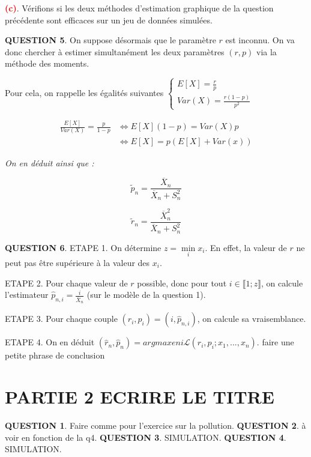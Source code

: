 \documentclass[a4paper,11pt]{article}
\newcommand{\quest}[1]{\small\textbf{#1}\normalsize}
\theoremstyle{nonumberplain}
\theoremstyle{nonumberplain}
\theoremstyle{nonumberplain}
\theoremstyle{nonumberplain}
\begin{document}
      \bigskip
      \textbf{\textcolor{red}{(c)}}. Vérifions si les deux méthodes d'estimation graphique
      de la question précédente sont efficaces sur un jeu de données simulées.

      \quest{QUESTION 5}. On suppose désormais que le paramètre $r$ est inconnu.
      On va donc chercher à estimer simultanément les deux paramètres $(r, p)$ via la méthode des moments.

      \medskip
      Pour cela, on rappelle les égalités suivantes
      $
        \begin{cases}
            E[X] = \frac{r}{p} \\
            Var(X) = \frac{r (1 - p)}{p^2}
        \end{cases}
      $
      \begin{calculs}
          \vspace{-2ex}
          \begin{equation*}
          \begin{split}
              \frac{E[X]}{Var(X)} = \frac{p}{1 - p} & \iff E[X](1 - p) = Var(X) p \\
                                                    & \iff E[X] = p(E[X] + Var(x))
          \end{split}
          \end{equation*}

          \emph{On en déduit ainsi que :}

          \[
              \tilde{p}_n = \frac{\overline{X}_n}{\overline{X}_n + S_n^2}
          \]

          \[
              \tilde{r}_n = \frac{\overline{X}_n^2}{\overline{X}_n + S_n^2}
          \]
      \end{calculs}

      \quest{QUESTION 6}. ETAPE 1. On détermine $z = \min\limits_{i} x_i$.
      En effet, la valeur de $r$ ne peut pas être supérieure à la valeur des $x_i$. \newline

      ETAPE 2. Pour chaque valeur de $r$ possible, donc pour tout $i \in \llbracket 1; z \rrbracket$, on calcule
      l'estimateur $\hat{p}_{n, i} = \frac{i}{\overline{X}_n}$ (sur le modèle de la question 1). \newline

      ETAPE 3. Pour chaque couple $(r_i, p_i) = (i, \hat{p}_{n, i})$, on calcule sa vraisemblance.\newline

      ETAPE 4. On en déduit $(\hat{r}_{n}, \hat{p}_{n}) = argmax en i \mathcal{L}(r_i, p_i; x_1, ..., x_n)$.
      faire une petite phrase de conclusion

    \section{PARTIE 2 ECRIRE LE TITRE}

      \quest{QUESTION 1}. Faire comme pour l'exercice sur la pollution.
      \quest{QUESTION 2}. à voir en fonction de la q4.
      \quest{QUESTION 3}. SIMULATION.
      \quest{QUESTION 4}. SIMULATION.
\end{document}
